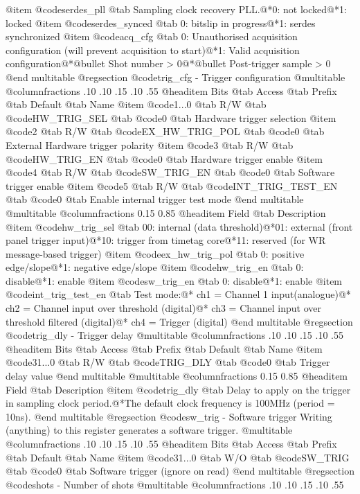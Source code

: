 @item @code{serdes_pll} @tab Sampling clock recovery PLL.@*0: not locked@*1: locked
@item @code{serdes_synced} @tab 0: bitslip in progress@*1: serdes synchronized
@item @code{acq_cfg} @tab 0: Unauthorised acquisition configuration (will prevent acquisition to start)@*1: Valid acquisition configuration@*@bullet{}  Shot number > 0@*@bullet{}  Post-trigger sample > 0
@end multitable
@regsection @code{trig_cfg} - Trigger configuration
@multitable @columnfractions .10 .10 .15 .10 .55
@headitem Bits @tab Access @tab Prefix @tab Default @tab Name
@item @code{1...0}
@tab R/W @tab
@code{HW_TRIG_SEL}
@tab @code{0} @tab 
Hardware trigger selection
@item @code{2}
@tab R/W @tab
@code{EX_HW_TRIG_POL}
@tab @code{0} @tab 
External Hardware trigger polarity
@item @code{3}
@tab R/W @tab
@code{HW_TRIG_EN}
@tab @code{0} @tab 
Hardware trigger enable
@item @code{4}
@tab R/W @tab
@code{SW_TRIG_EN}
@tab @code{0} @tab 
Software trigger enable
@item @code{5}
@tab R/W @tab
@code{INT_TRIG_TEST_EN}
@tab @code{0} @tab 
Enable internal trigger test mode
@end multitable
@multitable @columnfractions 0.15 0.85
@headitem Field @tab Description
@item @code{hw_trig_sel} @tab 00: internal (data threshold)@*01: external (front panel trigger input)@*10: trigger from timetag core@*11: reserved (for WR message-based trigger)
@item @code{ex_hw_trig_pol} @tab 0: positive edge/slope@*1: negative edge/slope
@item @code{hw_trig_en} @tab 0: disable@*1: enable
@item @code{sw_trig_en} @tab 0: disable@*1: enable
@item @code{int_trig_test_en} @tab Test mode:@* ch1 = Channel 1 input(analogue)@* ch2 = Channel input over threshold (digital)@* ch3 = Channel input over threshold filtered (digital)@* ch4 = Trigger (digital)
@end multitable
@regsection @code{trig_dly} - Trigger delay
@multitable @columnfractions .10 .10 .15 .10 .55
@headitem Bits @tab Access @tab Prefix @tab Default @tab Name
@item @code{31...0}
@tab R/W @tab
@code{TRIG_DLY}
@tab @code{0} @tab 
Trigger delay value
@end multitable
@multitable @columnfractions 0.15 0.85
@headitem Field @tab Description
@item @code{trig_dly} @tab Delay to apply on the trigger in sampling clock period.@*The default clock frequency is 100MHz (period = 10ns).
@end multitable
@regsection @code{sw_trig} - Software trigger
Writing (anything) to this register generates a software trigger.
@multitable @columnfractions .10 .10 .15 .10 .55
@headitem Bits @tab Access @tab Prefix @tab Default @tab Name
@item @code{31...0}
@tab W/O @tab
@code{SW_TRIG}
@tab @code{0} @tab 
Software trigger (ignore on read)
@end multitable
@regsection @code{shots} - Number of shots
@multitable @columnfractions .10 .10 .15 .10 .55
